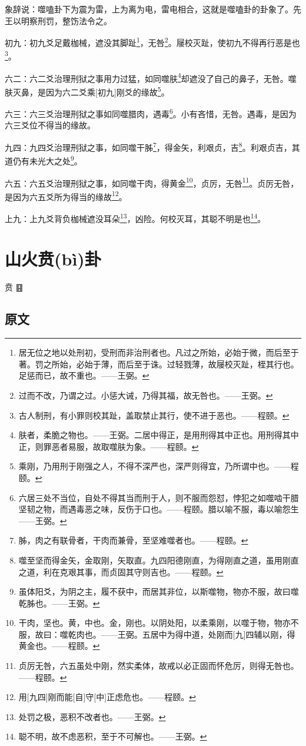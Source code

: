 \documentclass[12pt,oneside]{book}
\begin{document}
象辞说：噬嗑卦下为震为雷，上为离为电，雷电相合，这就是噬嗑卦的卦象了。先王以明察刑罚，整饬法令之。

初九：初九爻足戴枷械，遮没其脚趾\footnote{居无位之地以处刑初，受刑而非治刑者也。凡过之所始，必始于微，而后至于著。罚之所始，必始于薄，而后至于诛。过轻戮薄，故屦校灭趾，桎其行也。足惩而已，故不重也。——王弼。}，无咎\footnote{过而不改，乃谓之过。小惩大诫，乃得其福，故无咎也。——王弼。}。屦校灭趾，使初九不得再行恶是也\footnote{古人制刑，有小罪则校其趾，盖取禁止其行，使不进于恶也。——程颐。}。

六二：六二爻治理刑狱之事用力过猛，如同噬肤\footnote{肤者，柔脆之物也。——王弼。二居中得正，是用刑得其中正也。用刑得其中正，则罪恶者易服，故取噬肤为象。——程颐。}却遮没了自己的鼻子，无咎。噬肤灭鼻，是因为六二爻乘[初九]刚爻的缘故\footnote{乘刚，乃用刑于刚强之人，不得不深严也，深严则得宜，乃所谓中也。——程颐。}。

六三：六三爻治理刑狱之事如同噬腊肉，遇毒\footnote{六居三处不当位，自处不得其当而刑于人，则不服而怨怼，悖犯之如噬啮干腊坚韧之物，而遇毒恶之味，反伤于口也。——程颐。腊以喻不服，毒以喻怨生——王弼。}。小有吝惜，无咎。遇毒，是因为六三爻位不得当的缘故。

九四：九四爻治理刑狱之事，如同噬干胏\footnote{胏，肉之有联骨者，干肉而兼骨，至坚难噬者也。——程颐。}，得金矢，利艰贞，吉\footnote{噬至坚而得金矢，金取刚，矢取直。九四阳德刚直，为得刚直之道，虽用刚直之道，利在克艰其事，而贞固其守则吉也。——程颐。}。利艰贞吉，其道仍有未光大之处\footnote{虽体阳爻，为阴之主，履不获中，而居其非位，以斯噬物，物亦不服，故曰噬乾胏也。——王弼。}。

六五：六五爻治理刑狱之事，如同噬干肉，得黄金\footnote{干肉，坚也。黄，中也。金，刚也。以阴处阳，以柔乘刚，以噬于物，物亦不服，故曰：噬乾肉也。——王弼。五居中为得中道，处刚而[九]四辅以刚，得黄金也。——程颐。}，贞厉，无咎\footnote{贞厉无咎，六五虽处中刚，然实柔体，故戒以必正固而怀危厉，则得无咎也。——程颐。}。贞厉无咎，是因为六五爻所为得当的缘故\footnote{用[九四]刚而能[自]守[中]正虑危也。——程颐。}。

上九：上九爻背负枷械遮没耳朵\footnote{处罚之极，恶积不改者也。——王弼。}，凶险。何校灭耳，其聪不明是也\footnote{聪不明，故不虑恶积，至于不可解也。——王弼。}。



\chapter{山火贲(bì)卦}
贲 {\Large ䷕}

\section{原文}
\end{document}
